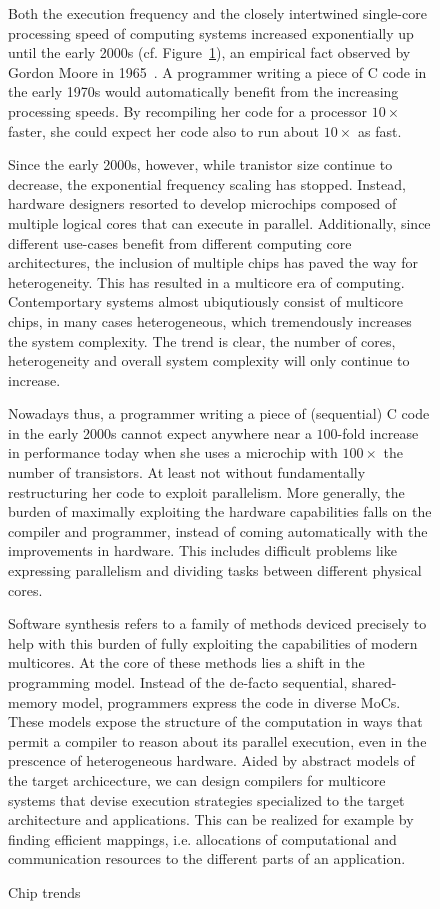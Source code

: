 \begin{figure}[h]
	\centering
   \resizebox{0.85\textwidth}{!}{}
	\caption{Chip trends}
	\label{fig:multicore_era}


Both the execution frequency and the closely intertwined single-core processing speed of computing systems increased exponentially up until the early 2000s (cf. Figure~\ref{fig:multicore_era}), an empirical fact observed by Gordon Moore in 1965~\cite{moore}. A programmer writing a piece of C code in the early 1970s would automatically benefit from the increasing processing speeds. By recompiling her code for a processor $10 \times$ faster, she could expect her code also to run about $10 \times$ as fast.%

Since the early 2000s, however, while tranistor size continue to decrease, the exponential frequency scaling has stopped. Instead, hardware designers resorted to develop microchips composed of multiple logical cores that can execute in parallel. Additionally, since different use-cases benefit from different computing core architectures, the inclusion of multiple chips has paved the way for heterogeneity. This has resulted in a multicore era of computing. Contemportary systems almost ubiqutiously consist of multicore chips, in many cases heterogeneous, which tremendously increases the system complexity. The trend is clear, the number of cores, heterogeneity and overall system complexity will only continue to increase.

Nowadays thus, a programmer writing a piece of (sequential) C code in the early 2000s cannot expect anywhere near a $100$-fold increase in performance today when she uses a microchip with $100 \times$ the number of transistors.
At least not without fundamentally restructuring her code to exploit parallelism.
More generally, the burden of maximally exploiting the hardware capabilities falls on the compiler and programmer, instead of coming automatically with the improvements in hardware.
This includes difficult problems like expressing parallelism and dividing tasks between different physical cores. %

Software synthesis refers to a family of methods deviced precisely to help with this burden of fully exploiting the capabilities of modern multicores. At the core of these methods lies a shift in the programming model. Instead of the de-facto sequential, shared-memory model, programmers express the code in diverse \acp{MoC}. These models expose the structure of the computation in ways that permit a compiler to reason about its parallel execution, even in the prescence of heterogeneous hardware. Aided by abstract models of the target archicecture, we can design compilers for multicore systems that devise execution strategies specialized to the target architecture and applications. This can be realized for example by finding efficient mappings, i.e. allocations of computational and communication resources to the different parts of an application.


\end{figure}
